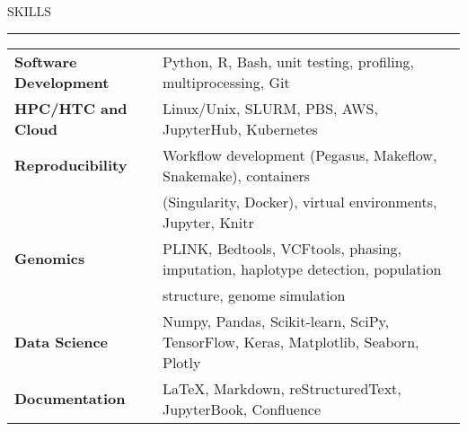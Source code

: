 \documentclass{resume} %
\renewenvironment{rSection}[1]{
\sectionskip
\textcolor{RoyalPurple}{\MakeUppercase{#1}}
\sectionlineskip
\hrule
\begin{list}{}{
\setlength{\leftmargin}{1.5em}
}
\item[]
}{
\end{list}
}
\begin{document}

\begin{rSection}{Skills}

\begin{tabular}{ @{} >{\bfseries}l @{\hspace{6ex}} l }
Software Development & Python, R, Bash, unit testing, profiling, multiprocessing, Git\\
HPC/HTC and Cloud & Linux/Unix, SLURM, PBS, AWS, JupyterHub, Kubernetes  \\
Reproducibility & Workflow development (Pegasus, Makeflow, Snakemake), containers \\ & (Singularity, Docker), virtual environments, Jupyter, Knitr \\
Genomics & PLINK, Bedtools, VCFtools, phasing, imputation, haplotype detection, population \\ & structure, genome simulation\\
Data Science & Numpy, Pandas, Scikit-learn, SciPy, TensorFlow, Keras, Matplotlib, Seaborn, Plotly \\
Documentation & \LaTeX, Markdown, reStructuredText, JupyterBook, Confluence \\
\end{tabular}

\end{rSection}

\end{document}
